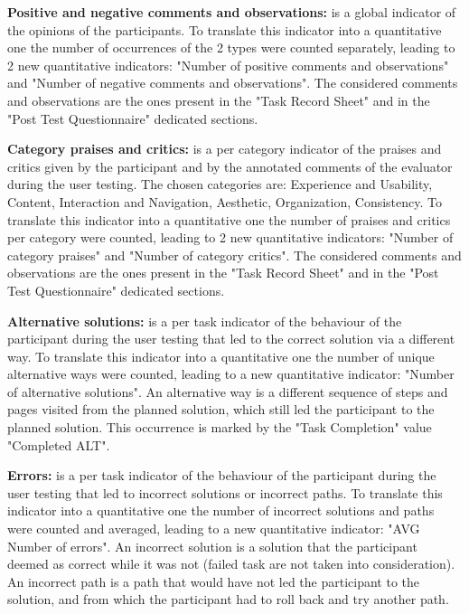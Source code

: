 \vspace{0.25cm}

\textbf{Positive and negative comments and observations:} is a global indicator of the opinions of the participants. To translate this indicator into a quantitative one the number of occurrences of the 2 types were counted separately, leading to 2 new quantitative indicators: "Number of positive comments and observations" and "Number of negative comments and observations". The considered comments and observations are the ones present in the "Task Record Sheet" and in the "Post Test Questionnaire" dedicated sections. 

\vspace{0.25cm}

\textbf{Category praises and critics:} is a per category indicator of the praises and critics given by the participant and by the annotated comments of the evaluator during the user testing. The chosen categories are: Experience and Usability, Content, Interaction and Navigation, Aesthetic, Organization, Consistency. To translate this indicator into a quantitative one the number of praises and critics per category were counted, leading to 2 new quantitative indicators: "Number of category praises" and "Number of category critics". The considered comments and observations are the ones present in the "Task Record Sheet" and in the "Post Test Questionnaire" dedicated sections.

\vspace{0.25cm}

\textbf{Alternative solutions:} is a per task indicator of the behaviour of the participant during the user testing that led to the correct solution via a different way. To translate this indicator into a quantitative one the number of unique alternative ways were counted, leading to a new quantitative indicator: "Number of alternative solutions". An alternative way is a different sequence of steps and pages visited from the planned solution, which still led the participant to the planned solution. This occurrence is marked by the "Task Completion" value "Completed ALT".

\vspace{0.25cm}

\textbf{Errors:} is a per task indicator of the behaviour of the participant during the user testing that led to incorrect solutions or incorrect paths. To translate this indicator into a quantitative one the number of incorrect solutions and paths were counted and averaged, leading to a new quantitative indicator: "AVG Number of errors". An incorrect solution is a solution that the participant deemed as correct while it was not (failed task are not taken into consideration). An incorrect path is a path that would have not led the participant to the solution, and from which the participant had to roll back and try another path.

